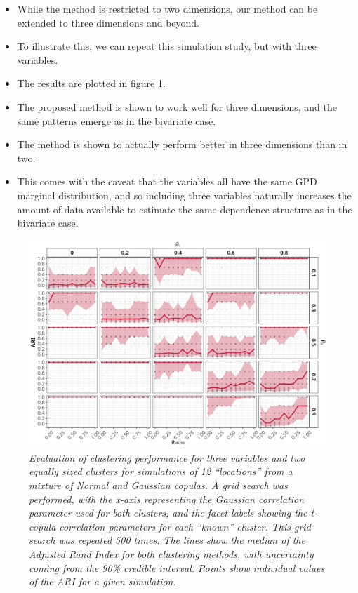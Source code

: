 \documentclass{article}
\numberwithin{equation}{section}
\begin{document}
\begin{itemize}
  \item While the \cite{Vignotto2021} method is restricted to two dimensions, our method can be extended to three dimensions and beyond.
  \item To illustrate this, we can repeat this simulation study, but with three variables. 
  \item The results are plotted in figure \ref{fig:02_3d}.
  \item The proposed method is shown to work well for three dimensions, and the same patterns emerge as in the bivariate case.
  \item The method is shown to actually perform better in three dimensions than in two.
  \item This comes with the caveat that the variables all have the same GPD marginal distribution, and so including three variables naturally increases the amount of data available to estimate the same dependence structure as in the bivariate case. 
\end{itemize}

\begin{figure}[H]
    \centering
    \includegraphics[width = 0.9\linewidth]{plots/sim_01c_js_sens_3_var_dqu_0.9.png}
    \caption{\emph{Evaluation of clustering performance for three variables and two equally sized clusters for simulations of 12 ``locations'' from a mixture of Normal and Gaussian copulas. A grid search was performed,  with the x-axis representing the Gaussian correlation parameter used for both clusters, and the facet labels showing the t-copula correlation parameters for each ``known'' cluster. This grid search was repeated 500 times. The lines show the median of the Adjusted Rand Index for both clustering methods, with uncertainty coming from the 90\% credible interval. Points show individual values of the ARI for a given simulation.}} 
    \label{fig:02_3d}
\end{figure}
\end{document}
